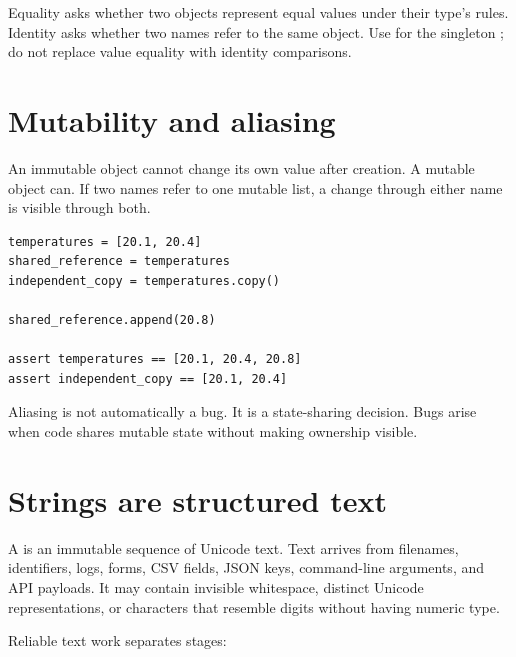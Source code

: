 Equality asks whether two objects represent equal values under their type's
rules. Identity asks whether two names refer to the same object. Use
 for the singleton ; do not replace value equality with
identity comparisons.

\section{Mutability and aliasing}

An immutable object cannot change its own value after creation. A mutable object
can. If two names refer to one mutable list, a change through either name is
visible through both.

\begin{lstlisting}
temperatures = [20.1, 20.4]
shared_reference = temperatures
independent_copy = temperatures.copy()

shared_reference.append(20.8)

assert temperatures == [20.1, 20.4, 20.8]
assert independent_copy == [20.1, 20.4]
\end{lstlisting}

Aliasing is not automatically a bug. It is a state-sharing decision. Bugs arise
when code shares mutable state without making ownership visible.

\section{Strings are structured text}

A  is an immutable sequence of Unicode text. Text arrives from
filenames, identifiers, logs, forms, CSV fields, JSON keys, command-line
arguments, and API payloads. It may contain invisible whitespace, distinct
Unicode representations, or characters that resemble digits without having
numeric type.

Reliable text work separates stages:

\begin{center}
\end{center}

